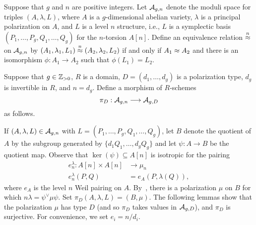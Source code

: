 \documentclass{amsart}
\begin{document}

Suppose that $g$ and $n$ are positive integers.
Let $\mathcal{A}_{g,n}$ denote the moduli space for triples $(A,\lambda,L)$, where $A$ is a $g$-dimensional abelian variety, $\lambda$ is a principal polarization on $A$, and $L$ is a level $n$ structure, i.e., $L$ is a symplectic basis $(P_1,\ldots,P_g,Q_1,\ldots,Q_g)$ for the $n$-torsion $A[n]$. Define an equivalence relation $\stackrel{n}{\approx}$ on $\mathcal{A}_{g,n}$ by $(A_1, \lambda_1, L_1) \stackrel{n}{\approx} (A_2, \lambda_2, L_2)$ if and only if $A_1 \approx A_2$ and 
there is an isomorphism $\phi: A_1 \to A_2$ such that $\phi(L_1) = L_2$. 

Suppose that $g\in\mathbb{Z}_{>0}$, $R$ is a domain,  $D=(d_1,\ldots,d_g)$ is a polarization type, $d_g$ is invertible in $R$, and $n = d_g$. Define a morphism of $R$-schemes 
  $$\pi_D:\mathcal{A}_{g,n} \longrightarrow \mathcal{A}_{g,{D}}$$
  as follows.

  If $(A,\lambda,L) \in \mathcal{A}_{g,n}$ with $L=(P_1,\ldots,P_g,Q_1,\ldots,Q_g)$, let $B$ denote the quotient of $A$ by the subgroup generated by $\{ d_1Q_1,\ldots,d_gQ_g \}$ and let $\psi: A \to B$ be the quotient map. Observe that $\ker(\psi) \subseteq A[n]$ is isotropic for the pairing
  \begin{align*}
    e_n^\lambda: A[n] \times A[n] &\to \mu_n \\
    e_n^\lambda(P,Q) &= e_A(P, \lambda(Q)),
  \end{align*}
  where $e_A$ is the level $n$ Weil pairing on $A$. By~\cite[Prop.~16.8]{milne-av}, there is a polarization $\mu$ on $B$ for which $n\lambda = \psi^\vee\mu\psi$.  
  Set $\pi_D(A,\lambda,L) = (B,\mu)$. The following lemmas show that the polarization $\mu$ has type $D$ (and so $\pi_D$ takes values in $\mathcal{A}_{g,{D}}$), and $\pi_D$ is surjective. For convenience, we set $e_i = n/d_i$.
\end{document}
